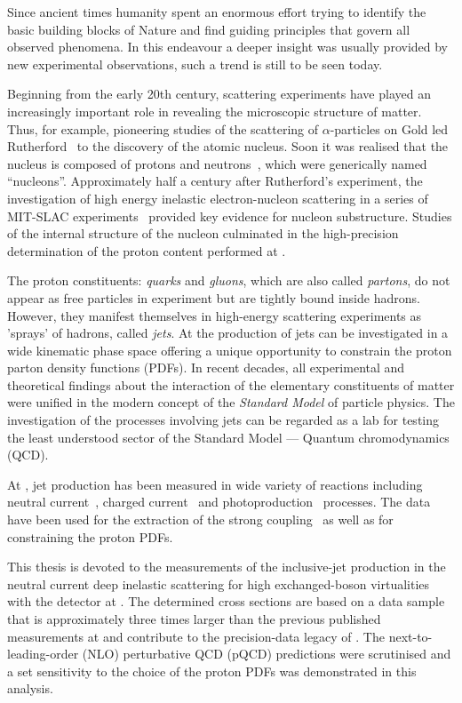 Since ancient times humanity spent an enormous effort trying to identify the basic building blocks of Nature and find guiding principles that govern all observed phenomena. In this endeavour a deeper insight was usually provided by new experimental observations, such a trend is still to be seen today.

Beginning from the early 20th century, scattering experiments have played an increasingly important role in revealing the microscopic structure of matter. Thus, for example, pioneering studies of the scattering of $\alpha$-particles on Gold led Rutherford~\cite{rutherford} to the discovery of the atomic nucleus. Soon it was realised that the nucleus is composed of protons and neutrons~\cite{Chadwick}, which were generically named ``nucleons''. Approximately half a century after Rutherford's experiment, the investigation of high energy inelastic electron-nucleon scattering in a series of MIT-SLAC experiments~\cite{slac} provided key evidence for nucleon substructure. Studies of the internal structure of the nucleon culminated in the high-precision determination of the proton content performed at \hera.

The proton constituents: \emph{quarks} and \emph{gluons}, which are also called \emph{partons}, do not appear as free particles in experiment but are tightly bound inside hadrons. However, they manifest themselves in high-energy scattering experiments as 'sprays' of hadrons, called \emph{jets}. At \hera the production of jets can be investigated in a wide kinematic phase space offering a unique opportunity to constrain the proton parton density functions (PDFs). In recent decades, all experimental and theoretical findings about the interaction of the elementary constituents of matter were unified in the modern concept of the \emph{Standard Model} of particle physics. The investigation of the processes involving jets can be regarded as a lab for testing the least understood sector of the Standard Model --- Quantum chromodynamics (QCD).

At \hera, jet production has been measured in wide variety of reactions including neutral current~\cite{ncjets}, charged current~\cite{ccjets} and photoproduction~\cite{phpjets} processes. The data have been used for the extraction of the strong coupling~\cite{jets} as well as for constraining the proton PDFs.

This thesis is devoted to the measurements of the inclusive-jet production in the neutral current deep inelastic scattering for high exchanged-boson virtualities with the \zeus detector at \hera. The determined cross sections are based on a data sample that is approximately three times larger than the previous published measurements at \zeus and contribute to the precision-data legacy of \hera. The next-to-leading-order (NLO) perturbative QCD (pQCD) predictions were scrutinised and a set sensitivity to the choice of the proton PDFs was demonstrated in this analysis.


